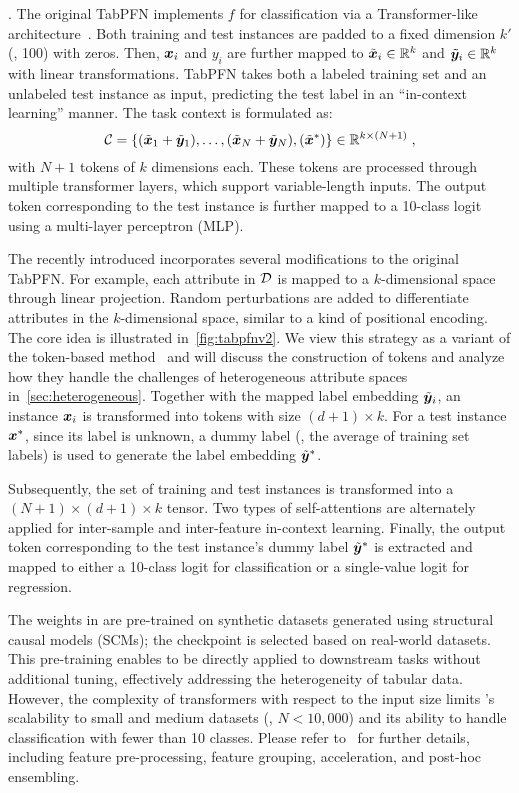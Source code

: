 .
The original TabPFN implements $f$ for classification via a Transformer-like architecture~\cite{Hollmann2022TabPFN}. Both training and test instances are padded to a fixed dimension $k'$ (\eg, 100) with zeros.
Then, ${\bm{x}}_i$ and $y_i$ are further mapped to $\tilde{{\bm{x}}}_i \in {\mathbb{R}}^k$ and $\tilde{{\bm{y}}}_i \in {\mathbb{R}}^k$ with linear transformations. TabPFN takes both a labeled training set and an unlabeled test instance as input, predicting the test label in an ``in-context learning'' manner. The task context is formulated as:
\begin{equation} {\mathcal{C}} = \{(\tilde{{\bm{x}}}_1 + \tilde{{\bm{y}}}_1), \ldots, (\tilde{{\bm{x}}}_N + \tilde{{\bm{y}}}_N), (\tilde{{\bm{x}}}^*)\}\in{\mathbb{R}}^{k \times (N+1)} \;,\notag \end{equation}
with $N+1$ tokens of $k$ dimensions each. These tokens are processed through multiple transformer layers, which support variable-length inputs. The output token corresponding to the test instance is further mapped to a 10-class logit using a multi-layer perceptron (MLP).

The recently introduced \ours incorporates several modifications to the original TabPFN. 
For example, each attribute in ${\mathcal{D}}$ is mapped to a $k$-dimensional space through linear projection. Random perturbations are added to differentiate attributes in the $k$-dimensional space, similar to a kind of positional encoding.
The core idea is illustrated in~\autoref{fig:tabpfnv2}. We view this strategy as a variant of the token-based method~\cite{SongS0DX0T19AutoInt,GorishniyRKB21Revisiting,Yan2024Making} and will discuss the construction of tokens and analyze how they handle the challenges of heterogeneous attribute spaces in~\autoref{sec:heterogeneous}. Together with the mapped label embedding $\tilde{{\bm{y}}}_i$, an instance ${\bm{x}}_i$ is transformed into tokens with size $(d+1)\times k$. For a test instance ${\bm{x}}^*$, since its label is unknown, a dummy label (\eg, the average of training set labels) is used to generate the label embedding $\tilde{{\bm{y}}}^*$.

Subsequently, the set of training and test instances is transformed into a ${(N+1) \times (d+1) \times k}$ tensor. Two types of self-attentions are alternately applied for inter-sample and inter-feature in-context learning. Finally, the output token corresponding to the test instance's dummy label $\tilde{{\bm{y}}}^*$ is extracted and mapped to either a 10-class logit for classification or a single-value logit for regression.

The weights in \ours are pre-trained on synthetic datasets generated using structural causal models (SCMs); the checkpoint is selected based on real-world datasets. This pre-training enables \ours to be directly applied to downstream tasks without additional tuning, effectively addressing the heterogeneity of tabular data. 
However, the complexity of transformers with respect to the input size limits \ours's scalability to small and medium datasets (\eg, $N < 10,000$) and its ability to handle classification with fewer than 10 classes. Please refer to~\citet{hollmann2025TabPFNv2} for further details, including feature pre-processing, feature grouping, acceleration, and post-hoc ensembling.